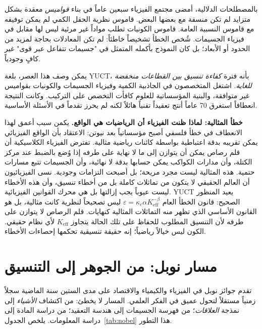 \documentclass[12pt,a4paper]{article}
\begin{document}
	بالمصطلحات الدلالية، أمضى مجتمع الفيزياء سبعين عاماً في بناء \emph{قواميس} معقدة بشكل متزايد لم تكن منسقة مع بعضها البعض. قاموس نظرية الحقل الكمي لم يمكن توفيقه مع قاموس النسبية العامة. قاموس الكونيات تطلب مواداً غير مرئية ليس لها مقابل في فيزياء الجسيمات. شُخص الخطأ تشخيصاً خاطئاً: لم تكن المعادلات بحاجة لمزيد من الحدود أو الأبعاد؛ بل كان النموذج بأكمله المتمثل في "جسيمات تتفاعل عبر قوى" غير كافٍ وجودياً.
	
	يمكن وصف هذا العصر، بلغة YUCT، بأنه فترة \emph{كفاءة تنسيق بين القطاعات منخفضة للغاية}. اشتغل المتخصصون في الجاذبية الكمية وفيزياء الجسيمات والكونيات بقواميس غير متوافقة، والبنية المؤسساتية للعلوم كافأت التخصص على التركيب. وكانت النتيجة انعطافاً استغرق 70 عاماً أنتج تعقيداً تقنياً هائلاً لكنه لم يحرز تقدماً في الأسئلة الأساسية.
	
	\textbf{خطأ المثالية: لماذا ظنت الفيزياء أن الرياضيات هي الواقع.} يكمن سبب أعمق لهذا الانعطاف في خطأ فلسفي أصبح مؤسساتياً بعد نيوتن: الاعتقاد بأن الواقع الفيزيائي يمكن تقريبه بدقة اعتباطية بواسطة كائنات رياضية مثالية. تفترض الفيزياء الكلاسيكية أن قلم رصاص يمكن أن يتوازن إلى ما لا نهاية على طرفه إذا وُضع بالضبط عند مركز الكتلة، وأن مدارات الكواكب يمكن حسابها بدقة لا نهائية، وأن الجسيمات تتبع مسارات حتمية. هذه المثالية ليست مجرد مريحة؛ بل أصبحت التزامات وجودية. نسى الفيزيائيون أن العالم الحقيقي لا يتكون من تماثلات كاملة بل من أخطاء تنسيق، وأن هذه الأخطاء ليست عيوباً يجب إزالتها بل هي محرك القوانين الفيزيائية. YUCT يعيد المنظور الصحيح: قانون الخطأ العام \(\varepsilon = \kappa_c \alpha K_{\mathrm{eff}}^{-\beta}\) ليس تصحيحاً لنظرية كانت مثالية، بل هو القانون الأساسي الذي تظهر منه التماثلات المثالية كنهايات. قلم الرصاص لا يتوازن على طرفه لأن التنسيق المطلوب للحفاظ على تلك الحالة يتجاوز \(K_{\mathrm{eff}}\) لأي نظام حقيقي. الكون ليس خيالاً رياضياً؛ إنه حقيقة تنسيقية تحكمها إحصاءات الأخطاء.
	
	\section{مسار نوبل: من الجوهر إلى التنسيق}
	
	تقدم جوائز نوبل في الفيزياء والكيمياء والاقتصاد على مدى الستين سنة الماضية سجلاً زمنياً مستقلاً لتحول عميق في الفكر العلمي. المسار لا يخطئ: من اكتشاف \emph{الأشياء} إلى نمذجة \emph{العلاقات}؛ من فهرسة الجسيمات إلى هندسة التعقيد؛ من دراسة المادة إلى دراسة المعلومات. يلخص الجدول~\ref{tab:nobel} هذا التطور.
	
\end{document}
